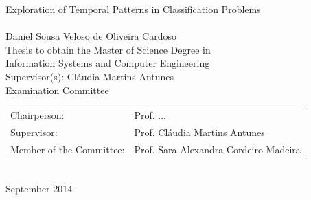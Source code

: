 \begin{center}
%
\vspace{5cm}

\vspace{1.0cm}
{\FontLb Exploration of Temporal Patterns in Classification Problems} \\
\vspace{1.9cm}
{} \\
\vspace{2.7cm}
{\FontMb Daniel Sousa Veloso de Oliveira Cardoso} \\
\vspace{2.0cm}
{\FontSn Thesis to obtain the Master of Science Degree in} \\
\vspace{0.3cm}
{\FontLb Information Systems and Computer Engineering} \\
\vspace{1.1cm}
{\FontSn Supervisor(s): Cláudia Martins Antunes} \\
\vspace{1.1cm}
{\FontMb Examination Committee} \\
\vspace{0.3cm}
{\FontSn %
\begin{tabular}{ll}
Chairperson: & Prof. ... \\
Supervisor: & Prof. Cláudia Martins Antunes \\
Member of the Committee: & Prof. Sara Alexandra Cordeiro Madeira
\end{tabular} } \\
\vspace{1.5cm}
{\FontMb September 2014} \\
%
\end{center}

\cleardoublepage

